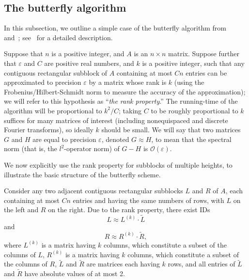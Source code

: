 \documentclass[final,3p,times]{elsarticle}
\def\epsilon{\varepsilon}
\def\bigoh{\mathcal{O}}
\begin{document}
\subsection{The butterfly algorithm}
\label{butterfly}

In this subsection, we outline a simple case of the butterfly algorithm
from~\cite{michielssen-boag} and~\cite{oneil-woolfe-rokhlin};
see~\cite{oneil-woolfe-rokhlin} for a detailed description.

Suppose that $n$ is a positive integer, and $A$ is an $n \times n$ matrix.
Suppose further that $\epsilon$ and $C$ are positive real numbers,
and $k$ is a positive integer, such that
any contiguous rectangular subblock of $A$ containing at most $Cn$ entries
can be approximated to precision $\epsilon$ by a matrix whose rank is $k$
(using the Frobenius/Hilbert-Schmidt norm to measure the accuracy
of the approximation);
we will refer to this hypothesis as ``{\it the rank property}.''
The running-time of the algorithm will be proportional to $k^2/C$;
taking $C$ to be roughly proportional to $k$ suffices
for many matrices of interest
(including nonequispaced and discrete Fourier transforms),
so ideally $k$ should be small.
We will say that two matrices $G$ and $H$ are equal
to precision $\epsilon$,
denoted $G \approx H$, to mean that the spectral norm
(that is, the $l^2$-operator norm) of $G-H$
is $\bigoh(\epsilon)$.

We now explicitly use the rank property for subblocks of multiple heights,
to illustrate the basic structure of the butterfly scheme.

Consider any two adjacent contiguous rectangular subblocks $L$ and $R$ of $A$,
each containing at most $Cn$ entries and having the same numbers of rows,
with $L$ on the left and $R$ on the right.
Due to the rank property, there exist IDs
\begin{equation}
\label{1}
L \approx L^{(k)} \cdot \widetilde{L}
\end{equation}
and
\begin{equation}
\label{2}
R \approx R^{(k)} \cdot \widetilde{R},
\end{equation}
where $L^{(k)}$ is a matrix having $k$ columns,
which constitute a subset of the columns of $L$,
$R^{(k)}$ is a matrix having $k$ columns,
which constitute a subset of the columns of $R$,
$\widetilde{L}$ and $\widetilde{R}$ are matrices each having $k$ rows,
and all entries of $\widetilde{L}$ and $\widetilde{R}$ have absolute values
of at most 2.
\end{document}

